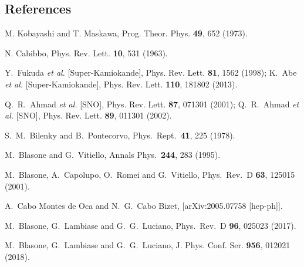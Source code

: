 \documentclass[floats,prd,aps,amssymb,nofootinbib,showkeys]{revtex4}
\begin{document}
\smallskip

\begin{thebibliography}{0}

\section*{References}
M. Kobayashi and T. Maskawa, Prog. Theor. Phys. {\bf 49}, 652 (1973).

N. Cabibbo, Phys. Rev. Lett. {\bf10}, 531 (1963). 

Y.~Fukuda \textit{et al.} [Super-Kamiokande],
Phys. Rev. Lett. \textbf{81}, 1562 (1998);
K.~Abe \textit{et al.} [Super-Kamiokande],
Phys. Rev. Lett. \textbf{110}, 181802 (2013).

Q.~R.~Ahmad \textit{et al.} [SNO],
Phys. Rev. Lett. \textbf{87}, 071301 (2001);
Q.~R.~Ahmad \textit{et al.} [SNO],
Phys. Rev. Lett. \textbf{89}, 011301 (2002).

S.~M.~Bilenky and B.~Pontecorvo,
  Phys.\ Rept.\  {\bf 41}, 225 (1978).
  
 M.~Blasone and G.~Vitiello,
  Annals Phys.\  {\bf 244}, 283 (1995).
  
  M.~Blasone, A.~Capolupo, O.~Romei and G.~Vitiello,
  Phys.\ Rev.\ D {\bf 63}, 125015 (2001).
  
A.~Cabo Montes de Oca and N.~G.~Cabo Bizet,
[arXiv:2005.07758 [hep-ph]].

M.~Blasone, G.~Lambiase and G.~G.~Luciano,
  Phys.\ Rev.\ D {\bf 96}, 025023 (2017).
  
M.~Blasone, G.~Lambiase and G.~G.~Luciano,
J. Phys. Conf. Ser. \textbf{956},  012021 (2018). 


\end{thebibliography}
\end{document}
